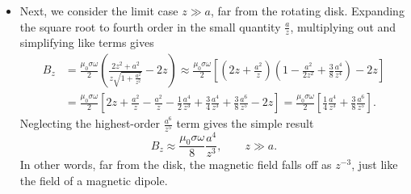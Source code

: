 \documentclass[11pt, a4paper]{article}
\begin{document}
\begin{itemize}
	\item Next, we consider the limit case $ z \gg a $, far from the rotating disk. Expanding the square root to fourth order in the small quantity $ \frac{a}{z} $, multiplying out and simplifying like terms gives
	\begin{align*}
		B_{z} &= \frac{\mu_{0}\sigma \omega}{2} \left(\frac{2z^{2} + a^{2}}{z\sqrt{1 + \frac{a^{2}}{z^{2}}}} - 2z\right) \approx \frac{\mu_{0}\sigma \omega}{2} \left[\left(2z + \frac{a^{2}}{z}\right)\left(1 - \frac{a^{2}}{2z^{2}} + \frac{3}{8}\frac{a^{4}}{z^{4}}\right) - 2z \right]\\
		& = \frac{\mu_{0}\sigma \omega}{2} \left[2z + \frac{a^{2}}{z} - \frac{a^{2}}{z} - \frac{1}{2}\frac{a^{4}}{z^{3}} + \frac{3}{4}\frac{a^{4}}{z^{3}} + \frac{3}{8}\frac{a^{6}}{z^{5}} - 2z\right] = \frac{\mu_{0}\sigma \omega}{2} \left[ \frac{1}{4}\frac{a^{4}}{z^{3}} + \frac{3}{8}\frac{a^{6}}{z^{5}}\right].
	\end{align*}
	Neglecting the highest-order $ \frac{a^{6}}{z^{5}} $ term gives the simple result
	\begin{equation*}
		B_{z} \approx  \frac{\mu_{0}\sigma \omega}{8} \frac{a^{4}}{z^{3}}, \qquad z \gg a.
	\end{equation*}
	In other words, far from the disk, the magnetic field falls off as $ z^{-3} $, just like the field of a magnetic dipole.
	

\end{itemize}
\end{document}
